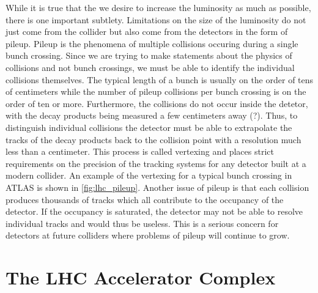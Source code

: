 While it is true that the we desire to increase the luminosity as much
as possible, there is one important subtlety. 
Limitations on the size of the luminosity do not just
come from the collider but also come from the detectors in the form of pileup.
Pileup is the phenomena of multiple collisions occuring during a single
bunch crossing. Since we are trying to make statements about the 
physics of collisions and not bunch crossings, we must be able to 
identify the individual collisions themselves. The typical length of 
a bunch is usually on the order of tens of centimeters while the number of pileup 
collisions per bunch crossing is on the order of ten or more. Furthermore, 
the collisions do not occur inside the detetor, with the decay products
being measured a few centimeters away (?). Thus, to distinguish individual
collisions the detector must be able to extrapolate the tracks of the decay
products back to the collision point with a resolution much less than 
a centimeter. This process is called vertexing and places strict 
requirements on the precision of the tracking systems for any detector
built at a modern collider. An example of the vertexing for a typical
bunch crossing in ATLAS is shown in \fig\ref{fig:lhc_pileup}.
Another issue of pileup is that each collision produces thousands of 
tracks which all contribute to the occupancy of the detector. If the occupancy
is saturated, the detector may not be able to resolve individual tracks
and would thus be useless. This is a serious concern for detectors
at future colliders where problems of pileup will continue to grow.


\section{The LHC Accelerator Complex}

